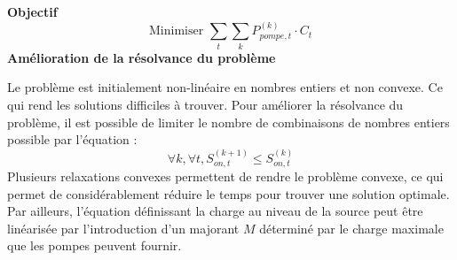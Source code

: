 \documentclass{article}
\begin{document}
\textbf{Objectif}
$$
    \text{Minimiser }   \sum_t \sum_k P_{pompe,t}^{(k)}\cdot C_t
$$
\clearpage
\textbf{Amélioration de la résolvance du problème}
\begin{multicols}{2}

    Le problème est initialement non-linéaire en nombres entiers et non convexe. Ce qui rend les solutions difficiles à trouver. Pour améliorer la résolvance du problème, il est possible de limiter le nombre de combinaisons de nombres entiers possible par l'équation :
    \begin{equation}
        \tag{Symétrie}
        \forall k, \forall t, S_{on,t}^{(k+1)}\leq S_{on,t}^{(k)}
    \end{equation}
    Plusieurs relaxations convexes permettent de rendre le problème convexe, ce qui permet de considérablement réduire le temps pour trouver une solution optimale.\\
    Par ailleurs, l'équation définissant la charge au niveau de la source peut être linéarisée par l'introduction d'un majorant $M$ déterminé par le charge maximale que les pompes peuvent fournir.
\end{multicols}
\end{document}
